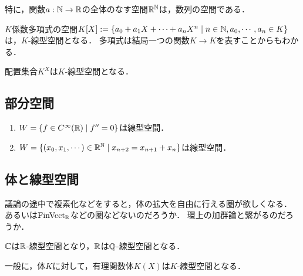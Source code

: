 \documentclass[uplatex, 12pt, dvipdfmx]{jsreport}
\begin{document}
\begin{example}
    特に，関数$a:\mathbb{N}\to\mathbb{R}$の全体のなす空間$\mathbb{R}^{\mathbb{N}}$は，数列の空間である．
\end{example}

\begin{example}
    $K$係数多項式の空間$K[X]:=\{a_0+a_1X+\cdots+a_nX^n\mid n\in\mathbb{N},a_0,\cdots,a_n\in K\}$は，$K$-線型空間となる．
    多項式は結局一つの関数$K\to K$を表すことからもわかる．
\end{example}

\begin{example}
    配置集合$K^X$は$K$-線型空間となる．
\end{example}

\subsection{部分空間}

\begin{example}[部分空間になるもの]\mbox{}
    \begin{enumerate}
        \item $W=\{f\in C^\infty(\mathbb{R})\mid  f''=0\}$は線型空間．
        \item $W=\{(x_0,x_1,\cdots)\in \mathbb{R}^{\mathbb{N}}\mid x_{n+2}=x_{n+1}+x_n\}$は線型空間．
    \end{enumerate}
\end{example}

\subsection{体と線型空間}

\begin{screen}
    議論の途中で複素化などをすると，体の拡大を自由に行える圏が欲しくなる．
    あるいは$\mathrm{FinVect}_{\mathbb{R}}$などの圏などないのだろうか．
    環上の加群論と繋がるのだろうか．
\end{screen}

\begin{example}
    $\mathbb{C}$は$\mathbb{R}$-線型空間となり，$\mathbb{R}$は$\mathbb{Q}$-線型空間となる．

    一般に，体$K$に対して，有理関数体$K(X)$は$K$-線型空間となる．
\end{example}
\end{document}
